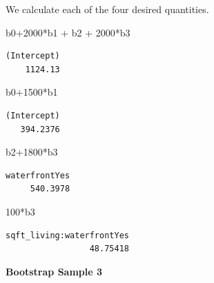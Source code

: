 \documentclass[
  letterpaper,
  DIV=11,
  numbers=noendperiod]{scrreprt}
\newenvironment{Shaded}{\begin{snugshade}}{\end{snugshade}}
\newcommand{\DecValTok}[1]{\textcolor[rgb]{0.68,0.00,0.00}{#1}}
\newcommand{\NormalTok}[1]{\textcolor[rgb]{0.00,0.23,0.31}{#1}}
\newcommand{\SpecialCharTok}[1]{\textcolor[rgb]{0.37,0.37,0.37}{#1}}
\begin{document}
We calculate each of the four desired quantities.

\begin{Shaded}
\begin{Highlighting}[]
\NormalTok{b0}\SpecialCharTok{+}\DecValTok{2000}\SpecialCharTok{*}\NormalTok{b1 }\SpecialCharTok{+}\NormalTok{ b2 }\SpecialCharTok{+} \DecValTok{2000}\SpecialCharTok{*}\NormalTok{b3}
\end{Highlighting}
\end{Shaded}

\begin{verbatim}
(Intercept) 
    1124.13 
\end{verbatim}

\begin{Shaded}
\begin{Highlighting}[]
\NormalTok{b0}\SpecialCharTok{+}\DecValTok{1500}\SpecialCharTok{*}\NormalTok{b1}
\end{Highlighting}
\end{Shaded}

\begin{verbatim}
(Intercept) 
   394.2376 
\end{verbatim}

\begin{Shaded}
\begin{Highlighting}[]
\NormalTok{b2}\SpecialCharTok{+}\DecValTok{1800}\SpecialCharTok{*}\NormalTok{b3}
\end{Highlighting}
\end{Shaded}

\begin{verbatim}
waterfrontYes 
     540.3978 
\end{verbatim}

\begin{Shaded}
\begin{Highlighting}[]
\DecValTok{100}\SpecialCharTok{*}\NormalTok{b3}
\end{Highlighting}
\end{Shaded}

\begin{verbatim}
sqft_living:waterfrontYes 
                 48.75418 
\end{verbatim}

\textbf{Bootstrap Sample 3}
\end{document}
